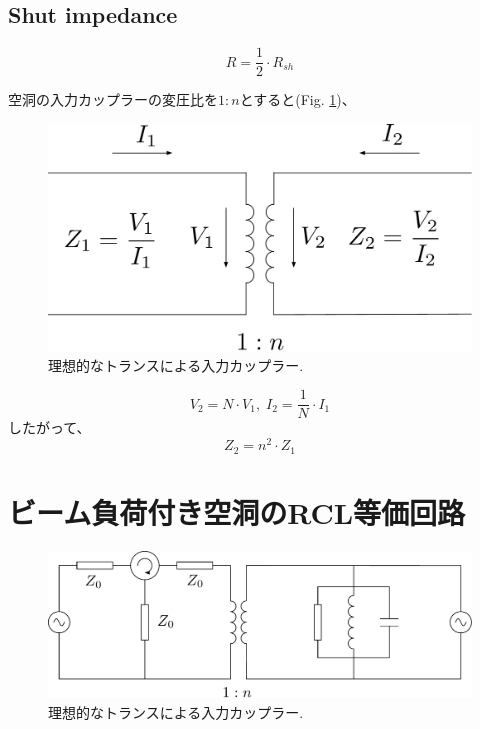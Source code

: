 \documentclass[book]{jlreq}
\begin{document}
\subsection{Shut impedance}
\begin{equation}
    R = \frac{1}{2}\cdot R_{sh}
\end{equation}

空洞の入力カップラーの変圧比を$1:n$とすると(Fig. \ref{fig:Ideal_Trans})、
%
\begin{figure}[hbt]
    \begin{center}
        \includegraphics[width=12cm,clip]{figs/Ideal_Transformer.pdf}
        \caption{理想的なトランスによる入力カップラー.}
        \label{fig:Ideal_Trans}
    \end{center}
\end{figure}
%
\begin{equation}
    V_2 = N\cdot V_1, \; I_2 = \frac{1}{N}\cdot I_1
\end{equation}
%
したがって、
\begin{equation}
    Z_2 = n^2 \cdot Z_1 
\end{equation}


\section{ビーム負荷付き空洞のRCL等価回路}

\begin{figure}[hbt]
    \begin{center}
      \includegraphics[width=12cm,clip]{figs/Cavity_Model.pdf}
      \caption{理想的なトランスによる入力カップラー.}
     \label{Cavity_Model}
    \end{center}
\end{figure}
\end{document}
